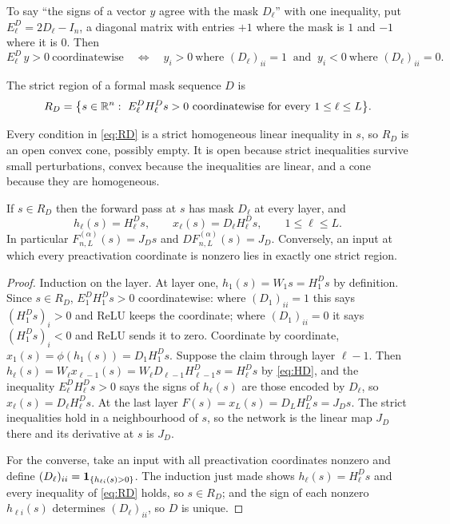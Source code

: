 To say ``the signs of a vector $y$ agree with the mask $D_\ell$'' with one inequality, put $E^D_\ell=2D_\ell-I_n$, a diagonal matrix with entries $+1$ where the mask is $1$ and $-1$ where it is $0$. Then
\[
E^D_\ell\,y>0\ \text{coordinatewise}\quad\Longleftrightarrow\quad y_i>0\ \text{where }(D_\ell)_{ii}=1\ \text{ and }\ y_i<0\ \text{where }(D_\ell)_{ii}=0 .
\]

\begin{definition}
The strict region of a formal mask sequence $D$ is
\begin{equation}\label{eq:RD}
R_D=\bigl\{s\in\mathbb{R}^n:\ E^D_\ell H^D_\ell s>0\ \text{coordinatewise for every }1\le\ell\le L\bigr\}.
\end{equation}
\end{definition}

Every condition in \cref{eq:RD} is a strict homogeneous linear inequality in $s$, so $R_D$ is an open convex cone, possibly empty. It is open because strict inequalities survive small perturbations, convex because the inequalities are linear, and a cone because they are homogeneous.

\begin{lemma}[consistency]\label{lem:consistency}
If $s\in R_D$ then the forward pass at $s$ has mask $D_\ell$ at every layer, and
\[
h_\ell(s)=H^D_\ell s,\qquad x_\ell(s)=D_\ell H^D_\ell s,\qquad 1\le\ell\le L .
\]
In particular $F^{(\alpha)}_{n,L}(s)=J_Ds$ and $DF^{(\alpha)}_{n,L}(s)=J_D$. Conversely, an input at which every preactivation coordinate is nonzero lies in exactly one strict region.
\end{lemma}

\begin{proof}
Induction on the layer. At layer one, $h_1(s)=W_1s=H^D_1s$ by definition. Since $s\in R_D$, $E^D_1H^D_1s>0$ coordinatewise: where $(D_1)_{ii}=1$ this says $(H^D_1s)_i>0$ and ReLU keeps the coordinate; where $(D_1)_{ii}=0$ it says $(H^D_1s)_i<0$ and ReLU sends it to zero. Coordinate by coordinate, $x_1(s)=\phi(h_1(s))=D_1H^D_1s$. Suppose the claim through layer $\ell-1$. Then $h_\ell(s)=W_\ell x_{\ell-1}(s)=W_\ell D_{\ell-1}H^D_{\ell-1}s=H^D_\ell s$ by \cref{eq:HD}, and the inequality $E^D_\ell H^D_\ell s>0$ says the signs of $h_\ell(s)$ are those encoded by $D_\ell$, so $x_\ell(s)=D_\ell H^D_\ell s$. At the last layer $F(s)=x_L(s)=D_LH^D_Ls=J_Ds$. The strict inequalities hold in a neighbourhood of $s$, so the network is the linear map $J_D$ there and its derivative at $s$ is $J_D$.

For the converse, take an input with all preactivation coordinates nonzero and define $(D_\ell)_{ii}=\mathbf{1}_{\{h_{\ell i}(s)>0\}}$. The induction just made shows $h_\ell(s)=H^D_\ell s$ and every inequality of \cref{eq:RD} holds, so $s\in R_D$; and the sign of each nonzero $h_{\ell i}(s)$ determines $(D_\ell)_{ii}$, so $D$ is unique.
\end{proof}

